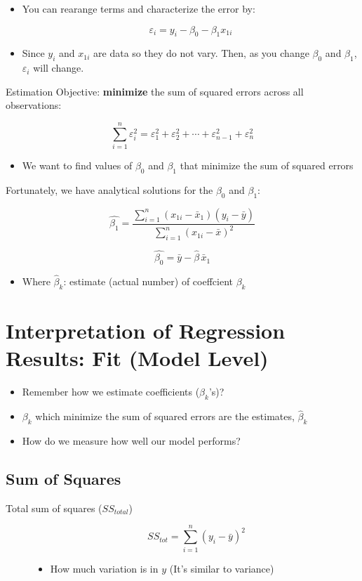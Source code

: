 \documentclass[10pt,article]{article}
\begin{document}
\begin{itemize}
\item You can rearange terms
and characterize the error by:

\[  \varepsilon_{i} =  y_{i} -  \beta_0 - \beta_{1} x_{1i} \]

\item Since \(y_i\) and \(x_{1i}\) are data so they do not vary. Then, as you
change \(\beta_0\) and \(\beta_1\), \(\varepsilon_{i}\) will change.
\end{itemize}

Estimation Objective: \textbf{minimize} the sum of squared errors across all
observations:

\[ \sum_{i=1}^n\varepsilon^2_i = \varepsilon^2_1 + \varepsilon^2_2 + \cdots +
   \varepsilon^2_{n-1} + \varepsilon^2_{n} \]

\begin{itemize}
\item We want to find values of \(\beta_0\) and \(\beta_1\) that minimize the
sum of squared errors
\end{itemize}

Fortunately, we have analytical solutions for the \(\beta_0\) and \(\beta_1\):

\[ \widehat{\beta_1} = \frac{ \sum_{i=1}^{n}
   (x_{1i}-\bar{x}_1)(y_{i}-\bar{y}) }{ \sum_{i=1}^{n} (x_{1i}-\bar{x})^2 }
   \]



\[ \widehat{\beta_0}  = \bar{y} - \widehat\beta\,\bar{x}_{1} \]

\begin{itemize}
\item Where \(\widehat{\beta}_{k}\): estimate (actual number) of coeffcient \(\beta_k\)
\end{itemize}
\section{Interpretation of Regression Results: Fit (Model Level)}
\label{sec:orgae17b85}
\begin{itemize}
\item Remember how we estimate coefficients (\(\beta_k\)'s)?
\item \(\beta_k\) which minimize the sum of squared errors are the
estimates, \(\widehat\beta_k\)
\item How do we measure how well our model performs?
\end{itemize}

\subsection{Sum of Squares}
\label{sec:orgf421c0b}
\begin{description}
\item[{Total sum of squares (\(SS_{total}\))}] \quad

\[  SS_{tot} = \sum_{i=1}^n (y_i - \bar{y})^2 \]

\begin{itemize}
\item How much variation is in \(y\) (It's similar to variance)
\end{itemize}
\end{description}
\end{document}
